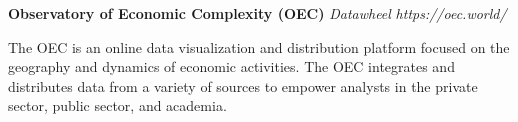 \item
\headerrow
{\textbf{Observatory of Economic Complexity (OEC)}}
{\emph{}}
\headerrow
{\emph{Datawheel}}
{\emph{https://oec.world/}}
\begin{itemize*}
    \item The OEC is an online data visualization and distribution platform 
    focused on the geography and dynamics of economic activities. 
    The OEC integrates and distributes data from a variety of sources to empower analysts 
    in the private sector, public sector, and academia.
\end{itemize*}